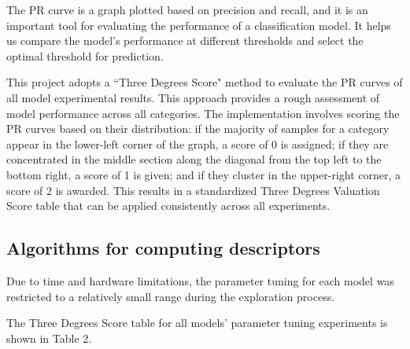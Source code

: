 \documentclass{article}
\begin{document}
The PR curve is a graph plotted based on precision and recall, and it is an important tool for evaluating the performance of a classification model. It helps us compare the model’s performance at different thresholds and select the optimal threshold for prediction.

This project adopts a “Three Degrees Score" method to evaluate the PR curves of all model experimental results. This approach provides a rough assessment of model performance across all categories. The implementation involves scoring the PR curves based on their distribution: if the majority of samples for a category appear in the lower-left corner of the graph, a score of 0 is assigned; if they are concentrated in the middle section along the diagonal from the top left to the bottom right, a score of 1 is given; and if they cluster in the upper-right corner, a score of 2 is awarded. This results in a standardized Three Degrees Valuation Score table that can be applied consistently across all experiments.

\subsection{Algorithms for computing descriptors}

Due to time and hardware limitations, the parameter tuning for each model was restricted to a relatively small range during the exploration process.

The Three Degrees Score table for all models' parameter tuning experiments is shown in Table 2.
\end{document}
